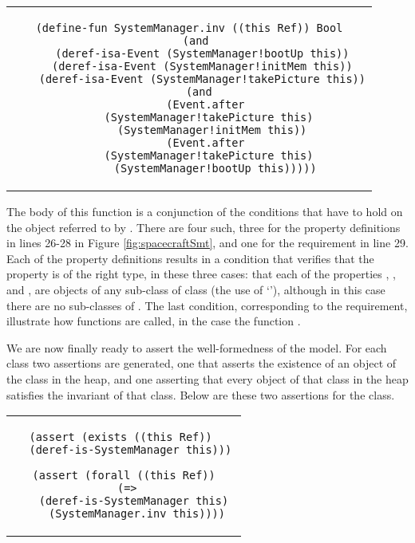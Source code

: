 \begin{center}
\begin{tabular}{c}
\begin{lstlisting}
(define-fun SystemManager.inv ((this Ref)) Bool
  (and
    (deref-isa-Event (SystemManager!bootUp this))
    (deref-isa-Event (SystemManager!initMem this))
    (deref-isa-Event (SystemManager!takePicture this))
    (and 
      (Event.after 
        (SystemManager!takePicture this)  
        (SystemManager!initMem this)) 
      (Event.after 
        (SystemManager!takePicture this)  
        (SystemManager!bootUp this)))))
\end{lstlisting}
\end{tabular}
\end{center}

The body of this function is a conjunction of the conditions that have
to hold on the  object referred to by
. There are four such, three for the property definitions
in lines 26-28 in Figure \ref{fig:spacecraftSmt}, and one for the
requirement in line 29. Each of the property definitions results in a
condition that verifies that the property is of the right type, in
these three cases: that each of the properties , , 
and , are objects of any sub-class of class  (the use
of `'), although in this case there are no sub-classes of
. The last condition, corresponding to the requirement,
illustrate how functions are called, in the case the function
.

We are now finally ready to assert the well-formedness of the
model. For each class two assertions are generated, one that asserts
the existence of an object of the class in the heap, and one asserting
that every object of that class in the heap satisfies the invariant of
that class. Below are these two assertions for the 
class.

\begin{center}
\begin{tabular}{c}
\begin{lstlisting}
(assert (exists ((this Ref)) 
  (deref-is-SystemManager this)))

(assert (forall ((this Ref))
  (=> 
    (deref-is-SystemManager this) 
    (SystemManager.inv this))))
\end{lstlisting}
\end{tabular}
\end{center}

